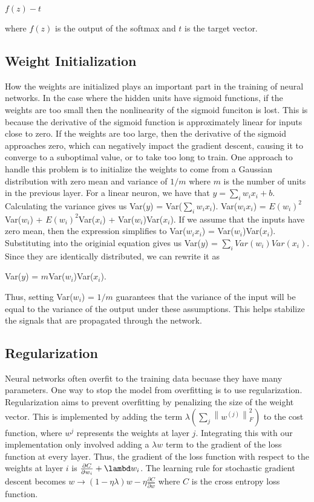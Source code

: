 \documentclass[10pt,twoside]{article}
\begin{document}
$f(z)-t$ 

where $f(z)$ is the output of the softmax and $t$ is the target vector. 

\subsection{Weight Initialization}

How the weights are initialized plays an important part in the training of neural networks. In the case where the hidden units have sigmoid functions, if the weights are too small then the nonlinearity of the sigmoid funciton is lost. This is because the derivative of the sigmoid function is approximately linear for inputs close to zero. If the weights are too large, then the derivative of the sigmoid approaches zero, which can negatively impact the gradient descent, causing it to converge to a suboptimal value, or to take too long to train. One approach to handle this problem is to initialize the weights to come from a Gaussian distribution with zero mean and variance of $1/m$ where $m$ is the number of units in the previous layer. For a linear neuron, we have that 
$y = \sum_i w_i x_i +b$. 
Calculating the variance gives us 
Var($y$) = Var($\sum_i w_i x_i$). 
Var($w_i x_i$) = $E(w_i)^2$Var($w_i$) + $E(w_i)^2$Var($x_i$) + Var($w_i$)Var($x_i$). 
If we assume that the inputs have zero mean, then the expression simplifies to 
Var($w_i x_i$) = Var($w_i$)Var($x_i$). 
Substituting into the originial equation gives us 
Var($y$) = $\sum_i Var(w_i)Var(x_i)$. 
Since they are identically distributed, we can rewrite it as 

Var($y$) = $m$Var($w_i$)Var($x_i$). 

Thus, setting Var($w_i$) = $1/m$ guarantees that the variance of the input will be equal to the variance of the output under these assumptions. This helps stabilize the signals that are propagated through the network. 

\subsection{Regularization}

Neural networks often overfit to the training data becuase they have many parameters. One way to stop the model from overfitting is to use regularization. Regularization aims to prevent overfitting by penalizing the size of the weight vector. This is implemented by adding the term $\lambda (\sum_j  \left \|w^{(j)}  \right \|^2_F )$ to the cost function, where $w^{j}$ represents the weights at layer $j$. Integrating this with our implementation only involved adding a $\lambda w$ term to the gradient of the loss function at every layer. Thus, the gradient of the loss function with respect to the weights at layer $i$ is $\frac{\partial C}{\partial w_i} + \lambd w_i$. The learning rule for stochastic gradient descent becomes $w \rightarrow (1- \eta \lambda)w - \eta \frac{\partial C}{\partial w} $ where $C$ is the cross entropy loss function.
\end{document}
